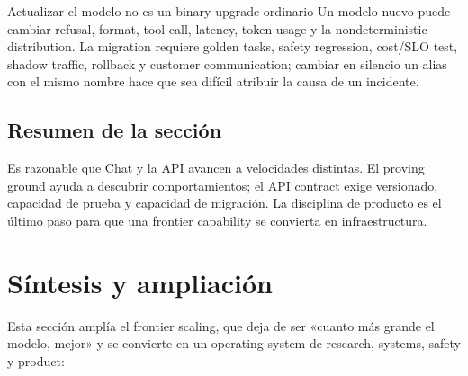 \documentclass[a4paper]{article}
\begin{document}

\begin{warningbox}{Actualizar el modelo no es un binary upgrade ordinario}
Un modelo nuevo puede cambiar refusal, format, tool call, latency, token usage y la nondeterministic distribution. La migration requiere golden tasks, safety regression, cost/SLO test, shadow traffic, rollback y customer communication; cambiar en silencio un alias con el mismo nombre hace que sea difícil atribuir la causa de un incidente.
\end{warningbox}

\subsection{Resumen de la sección}

Es razonable que Chat y la API avancen a velocidades distintas. El proving ground ayuda a descubrir comportamientos; el API contract exige versionado, capacidad de prueba y capacidad de migración. La disciplina de producto es el último paso para que una frontier capability se convierta en infraestructura.
\section{Síntesis y ampliación}

Esta sección amplía el frontier scaling, que deja de ser «cuanto más grande el modelo, mejor» y se convierte en un operating system de research, systems, safety y product:
\end{document}
